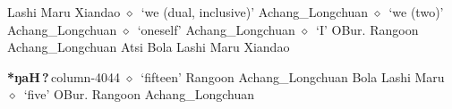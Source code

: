 \hspace{1ex}
         Lashi 
\hspace{1ex}
         Maru 
\hspace{1ex}
         Xiandao 
\hspace{1ex}
         $\diamond$~`we (dual, inclusive)'
         Achang\_Longchuan 
\hspace{1ex}
         $\diamond$~`we (two)'
         Achang\_Longchuan 
\hspace{1ex}
         $\diamond$~`oneself'
         Achang\_Longchuan 
\hspace{1ex}
         $\diamond$~`I'
         OBur. 
\hspace{1ex}
         Rangoon 
\hspace{1ex}
         Achang\_Longchuan 
\hspace{1ex}
         Atsi 
\hspace{1ex}
         Bola 
\hspace{1ex}
         Lashi 
\hspace{1ex}
         Maru 
\hspace{1ex}
         Xiandao 
  \item {\footnotesize \textbf{*ŋaH\,?\,}}{\tiny column-4044}
         $\diamond$~`fifteen'
         Rangoon 
\hspace{1ex}
         Achang\_Longchuan 
\hspace{1ex}
         Bola 
\hspace{1ex}
         Lashi 
\hspace{1ex}
         Maru 
\hspace{1ex}
         $\diamond$~`five'
         OBur. 
\hspace{1ex}
         Rangoon 
\hspace{1ex}
         Achang\_Longchuan 
